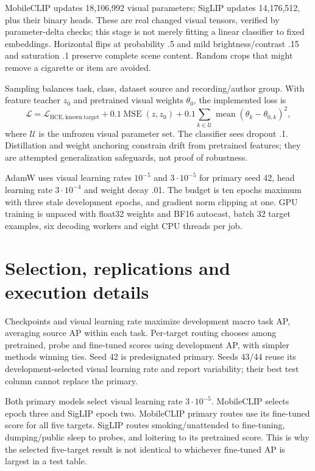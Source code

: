 MobileCLIP updates 18,106,992 visual parameters; SigLIP updates 14,176,512, plus their binary heads. These are real changed visual tensors, verified by parameter-delta checks; this stage is not merely fitting a linear classifier to fixed embeddings. Horizontal flips at probability .5 and mild brightness/contrast .15 and saturation .1 preserve complete scene content. Random crops that might remove a cigarette or item are avoided.

Sampling balances task, class, dataset source and recording/author group. With feature teacher $z_0$ and pretrained visual weights $\theta_0$, the implemented loss is
\begin{equation}
\mathcal L = \mathcal L_{\mathrm{BCE,known\ target}} +0.1\operatorname{MSE}(z,z_0)
+0.1\sum_{k\in\mathcal U}\operatorname{mean}(\theta_k-\theta_{0,k})^2,
\end{equation}
where $\mathcal U$ is the unfrozen visual parameter set. The classifier sees dropout .1. Distillation and weight anchoring constrain drift from pretrained features; they are attempted generalization safeguards, not proof of robustness.

AdamW uses visual learning rates $10^{-5}$ and $3\cdot10^{-5}$ for primary seed 42, head learning rate $3\cdot10^{-4}$ and weight decay .01. The budget is ten epochs maximum with three stale development epochs, and gradient norm clipping at one. GPU training is unpaced with float32 weights and BF16 autocast, batch 32 target examples, six decoding workers and eight CPU threads per job.

\section{Selection, replications and execution details}
Checkpoints and visual learning rate maximize development macro task AP, averaging source AP within each task. Per-target routing chooses among pretrained, probe and fine-tuned scores using development AP, with simpler methods winning ties. Seed 42 is predesignated primary. Seeds 43/44 reuse its development-selected visual learning rate and report variability; their best test column cannot replace the primary.

Both primary models select visual learning rate $3\cdot10^{-5}$. MobileCLIP selects epoch three and SigLIP epoch two. MobileCLIP primary routes use its fine-tuned score for all five targets. SigLIP routes smoking/unattended to fine-tuning, dumping/public sleep to probes, and loitering to its pretrained score. This is why the selected five-target result is not identical to whichever fine-tuned AP is largest in a test table.

